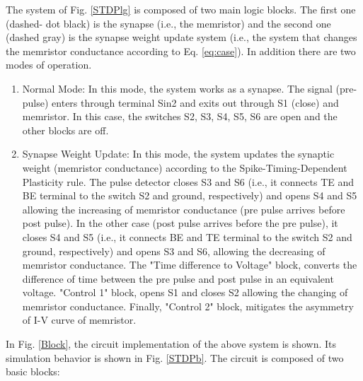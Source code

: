 \documentclass[review]{elsarticle}
\begin{document}
The system of Fig. \ref{STDPlg} is composed of two main logic blocks. The first one (dashed- dot black) is the synapse (i.e., the memristor) and the second one (dashed gray) is the synapse weight update system (i.e., the system that changes the memristor conductance according to Eq. \ref{eq:case}).
In addition there are two modes of operation. 
\begin{enumerate}

\item Normal Mode: In this mode, the system works as a synapse. The signal (pre-pulse) enters through terminal Sin2 and exits out through S1 (close) and memristor. In this case, the switches S2, S3, S4, S5, S6 are open and the other blocks are off. 

\item Synapse Weight Update: In this mode, the system updates the synaptic weight (memristor conductance) according to the Spike-Timing-Dependent Plasticity rule. The pulse detector closes S3 and S6 (i.e., it  connects TE and BE terminal to the switch S2 and ground, respectively) and opens S4 and S5 allowing the increasing of memristor conductance (pre pulse arrives before post pulse). In the other case (post pulse arrives before the pre pulse), it closes S4 and S5 (i.e., it  connects BE and TE terminal to the switch S2 and ground, respectively) and opens S3 and S6, allowing the decreasing of memristor conductance.
The "Time difference to Voltage" block, converts the difference of time between the pre pulse and post pulse in an equivalent voltage. "Control 1" block, opens S1 and closes S2 allowing the changing of memristor conductance. Finally, "Control 2" block, mitigates the asymmetry of I-V curve of memristor.    
\end{enumerate}
In Fig. \ref{Block}, the circuit implementation of the above system is shown.  
Its simulation behavior is shown in Fig. \ref{STDPb}.
The circuit is composed of two basic blocks:
\end{document}
